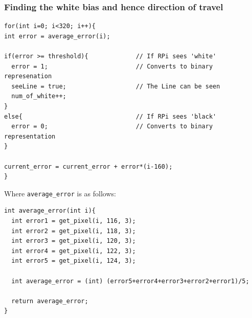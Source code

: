 \documentclass[paper=a4, fontsize=11pt]{scrartcl} %
\numberwithin{equation}{section} %
\numberwithin{figure}{section} %
\begin{document}
\subsubsection{Finding the white bias and hence direction of travel}
\begin{verbatim}
for(int i=0; i<320; i++){
int error = average_error(i);

if(error >= threshold){				// If RPi sees 'white'
  error = 1;						// Converts to binary represenation
  seeLine = true;					// The Line can be seen
  num_of_white++;
}
else{								// If RPi sees 'black'
  error = 0;						// Converts to binary representation
}

current_error = current_error + error*(i-160);
}
\end{verbatim}
Where \verb|average_error| is as follows:\\
\begin{verbatim}
int average_error(int i){
  int error1 = get_pixel(i, 116, 3);
  int error2 = get_pixel(i, 118, 3);
  int error3 = get_pixel(i, 120, 3);
  int error4 = get_pixel(i, 122, 3);
  int error5 = get_pixel(i, 124, 3);

  int average_error = (int) (error5+error4+error3+error2+error1)/5;

  return average_error;
}
\end{verbatim}
\end{document}
